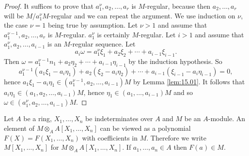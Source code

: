 \documentclass[../main]{subfiles}
\begin{document}
\begin{proof}
It suffices to prove that $a_1^\nu, a_2, \ldots, a_r$ is $M$-regular, because then $a_2, \ldots, a_r$ will be $M/a_1^{\nu}M$-regular and we can repeat the argument. We use induction on $\nu$, the case $\nu=1$ being true by assumption. Let $\nu>1$ and assume that $a_1^{\nu-1}, a_2, \ldots, a_r$ is $M$-regular. $a_1^\nu$ is certainly $M$-regular. Let $i>1$ and assume that $a_1^\nu, a_2, \ldots, a_{i-1}$ is an $M$-regular sequence. Let \[a_i\omega=a_1^\nu\xi_1+a_2\xi_2+\cdots+a_{i-1}\xi_{i-1}.\] Then $\omega=a_1^{\nu-1} n_1+a_2\eta_2+\cdots+a_{i-1}\eta_{i-1}$ by the induction hypothesis. So \[a_1^{\nu-1}(a_1 \xi_1-a_i \eta_1)+a_2(\xi_2-a_i \eta_2)+\cdots+a_{i-1}(\xi_{i-1}-a_i \eta_{i-1})=0,\] hence $a_1 \xi_1-a_i \eta_1 \in(a_1^{\nu-1}, a_2, \ldots, a_{i-1})M$ by Lemma \ref{lem:15.01}. It follows that \newline $a_i \eta_1 \in(a_1, a_2, \ldots, a_{i-1})M$, hence $\eta_1 \in(a_1, \ldots, a_{i-1}) M$ and so\linebreak$\omega \in(a_1^\nu, a_2, \ldots, a_{i-1})M$.
\end{proof} 

\newparagraph Let $A$ be a ring, $X_1, \ldots, X_n$ be indeterminates over $A$ and $M$ be an $A$-module. An element of $M \otimes_A A[X_1, \ldots, X_n]$ can be viewed as a polynomial $F(X)=F(X_1, \ldots, X_n)$ with coefficients in $M$. Therefore we write $M[X_1, \ldots, X_n]$ for $M \otimes_A A[X_1, \ldots, X_n]$. If $a_1, \ldots, a_n \in A$ then $F(a) \in M$.
\end{document}
